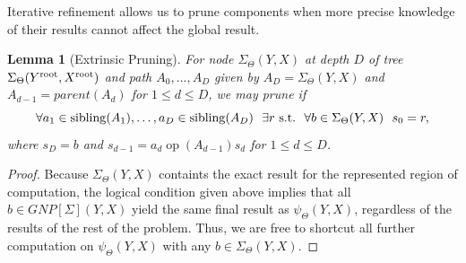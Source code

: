 \documentclass{article}
\newtheorem{lemma}{Lemma}
\newcommand{\killspace}{\vspace{-0.08in}}
\newcommand{\GNP}[1][\psi]{{#1}_{\Theta}}
\DeclareMathOperator{\sibling}{sibling}
\DeclareMathOperator{\op}{op}
\newcommand{\st}{{\rm~s.t.~}}
\newcommand{\kdroot}[1]{#1^{\text{\rm root}}}
\begin{document}
Iterative refinement allows us to prune components when more precise
knowledge of their results cannot affect the global result.
\begin{lemma}[Extrinsic Pruning]
  For node $\GNP[\Sigma](Y,X)$ at depth $D$ of tree
  $\GNP[\Sigma](\kdroot{Y},\kdroot{X})$ and path $A_0,\ldots,A_D$ given by
  $A_D = \GNP[\Sigma](Y,X)$ and $A_{d-1} = parent(A_{d})$ for $1 \leq
  d \leq D$, we may prune if
  \[
  \forall a_1 \in \sibling(A_1),\ldots,a_D \in \sibling(A_D)~~ \exists r \st~ \forall b \in \GNP[\Sigma](Y,X)~~ s_0 = r,
  \]
  where $s_D = b$ and $s_{d-1} = a_d \mathbin{\op(A_{d-1})} s_d$ for $1 \leq d
    \leq D$.
\end{lemma}
\killspace
\begin{proof}
  Because $\GNP[\Sigma](Y,X)$ containts the exact result for the
  represented region of computation, the logical condition given above
  implies that all $b \in GNP[\Sigma](Y,X)$ yield the same final
  result as $\GNP(Y,X)$, regardless of the results of the rest of the
  problem.  Thus, we are free to shortcut all further computation on
  $\GNP(Y,X)$ with any $b \in \GNP[\Sigma](Y,X)$.
\end{proof}
\end{document}
